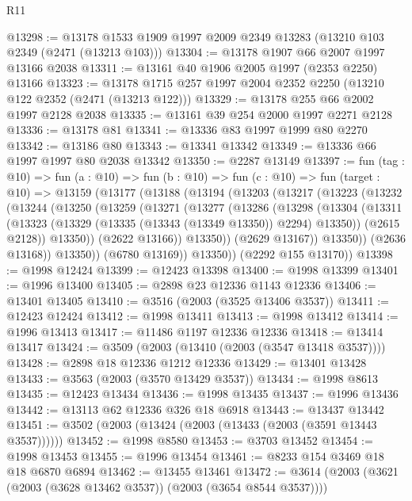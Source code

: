 \begin{lexlean}{R11}
\begin{coremodule}
@13298 := @13178 @1533 @1909 @1997 @2009 @2349 @13283 (@13210 @103 @2349 (@2471 (@13213 @103)))
@13304 := @13178 @1907 @66 @2007 @1997 @13166 @2038
@13311 := @13161 @40 @1906 @2005 @1997 (@2353 @2250) @13166
@13323 := @13178 @1715 @257 @1997 @2004 @2352 @2250 (@13210 @122 @2352 (@2471 (@13213 @122)))
@13329 := @13178 @255 @66 @2002 @1997 @2128 @2038
@13335 := @13161 @39 @254 @2000 @1997 @2271 @2128
@13336 := @13178 @81
@13341 := @13336 @83 @1997 @1999 @80 @2270
@13342 := @13186 @80
@13343 := @13341 @13342
@13349 := @13336 @66 @1997 @1997 @80 @2038 @13342
@13350 := @2287 @13149
@13397 := fun (tag : @10) =>
  fun (a : @10) =>
  fun (b : @10) =>
  fun (c : @10) =>
  fun (target : @10) =>
  @13159
    (@13177
      (@13188
        (@13194
          (@13203
            (@13217
              (@13223
                (@13232
                  (@13244
                    (@13250
                      (@13259
                        (@13271
                          (@13277
                            (@13286
                              (@13298
                                (@13304
                                  (@13311
                                    (@13323 (@13329 (@13335 (@13343 (@13349 @13350)) @2294) @13350))
                                    (@2615 @2128))
                                  @13350))
                              (@2622 @13166))
                            @13350))
                        (@2629 @13167))
                      @13350))
                  (@2636 @13168))
                @13350))
            (@6780 @13169))
          @13350))
      (@2292 @155 @13170))
@13398 := @1998 @12424
@13399 := @12423 @13398
@13400 := @1998 @13399
@13401 := @1996 @13400
@13405 := @2898 @23 @12336 @1143 @12336
@13406 := @13401 @13405
@13410 := @3516 (@2003 (@3525 @13406 @3537))
@13411 := @12423 @12424
@13412 := @1998 @13411
@13413 := @1998 @13412
@13414 := @1996 @13413
@13417 := @11486 @1197 @12336 @12336
@13418 := @13414 @13417
@13424 := @3509 (@2003 (@13410 (@2003 (@3547 @13418 @3537))))
@13428 := @2898 @18 @12336 @1212 @12336
@13429 := @13401 @13428
@13433 := @3563 (@2003 (@3570 @13429 @3537))
@13434 := @1998 @8613
@13435 := @12423 @13434
@13436 := @1998 @13435
@13437 := @1996 @13436
@13442 := @13113 @62 @12336 @326 @18 @6918
@13443 := @13437 @13442
@13451 := @3502 (@2003 (@13424 (@2003 (@13433 (@2003 (@3591 @13443 @3537))))))
@13452 := @1998 @8580
@13453 := @3703 @13452
@13454 := @1998 @13453
@13455 := @1996 @13454
@13461 := @8233 @154 @3469 @18 @18 @6870 @6894
@13462 := @13455 @13461
@13472 := @3614 (@2003 (@3621 (@2003 (@3628 @13462 @3537)) (@2003 (@3654 @8544 @3537))))

\end{coremodule}
\end{lexlean}

